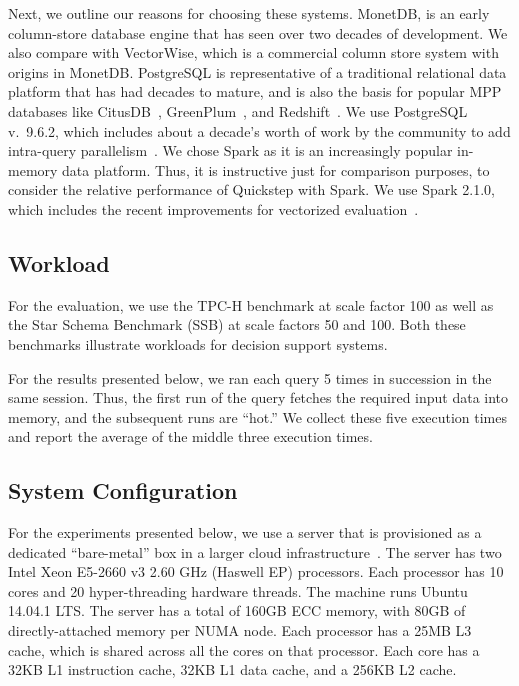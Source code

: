 Next, we outline our reasons for choosing these systems.
MonetDB, is an early column-store database engine that has seen over two decades of development.
We also compare with VectorWise, which is a commercial column store system with origins in MonetDB.
PostgreSQL is representative of a traditional relational data platform that has had decades to mature, and is also the basis for popular MPP databases like CitusDB~\cite{citusdata}, GreenPlum~\cite{greenplum}, and Redshift~\cite{redshift}. We use PostgreSQL v.~9.6.2, which includes about a decade's worth of work by the community to add intra-query parallelism~\cite{pg-parallelquery}.
We chose Spark as it is an increasingly popular in-memory data platform. Thus, it is instructive just for comparison purposes, to consider the relative performance of Quickstep with Spark. We use Spark 2.1.0, which includes the recent improvements for vectorized evaluation~\cite{spark-10x-in-2}.

\subsection{Workload} \label{exp-workload}
For the evaluation, we use the TPC-H benchmark at scale factor 100 %
as well as the Star Schema Benchmark (SSB) at scale factors 50 and 100. %
Both these benchmarks illustrate workloads for decision support systems.

For the results presented below, we ran each query 5 times in succession in the same session. Thus, the first run of the query fetches the required input data into memory, and the subsequent runs are ``hot.'' We collect these five execution times and report the average of the middle three execution times.

\subsection{System Configuration} \label{exp-system}
For the experiments presented below, we use a server that is provisioned as a dedicated ``bare-metal'' box in a larger cloud infrastructure~\cite{RicciEide:login14}. The server has two Intel Xeon E5-2660 v3 2.60 GHz (Haswell EP) processors. Each processor has 10 cores and 20 hyper-threading hardware threads. The machine runs Ubuntu 14.04.1 LTS. The server has a total of 160GB ECC memory, %
with 80GB of directly-attached memory per NUMA node. Each processor has a 25MB  L3 cache, which is shared across all the cores on that processor. Each core has a 32KB L1 instruction cache, 32KB L1 data cache, and a 256KB L2 cache.

